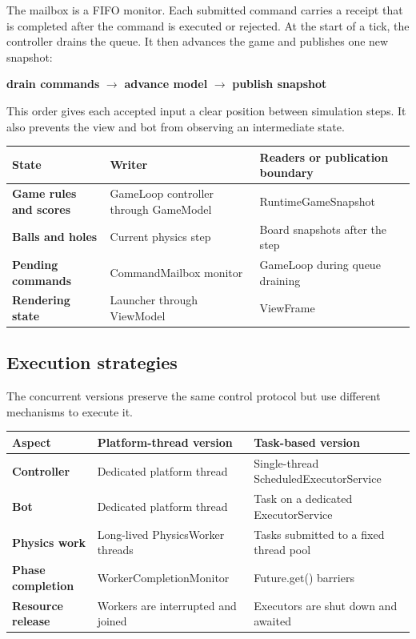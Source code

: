 The mailbox is a FIFO monitor. Each submitted command carries a receipt that
is completed after the command is executed or rejected. At the start of a
tick, the controller drains the queue. It then advances the game and publishes
one new snapshot:

\begin{center}
\textbf{drain commands} $\rightarrow$ \textbf{advance model}
$\rightarrow$ \textbf{publish snapshot}
\end{center}

This order gives each accepted input a clear position between simulation
steps. It also prevents the view and bot from observing an intermediate state.

\begin{center}
\begin{tabular}{|>{\bfseries}p{3.1cm}|p{5.2cm}|p{5.2cm}|}
    \hline
    State & Writer & Readers or publication boundary \\
    \hline
    Game rules and scores & GameLoop controller through GameModel & RuntimeGameSnapshot \\
    \hline
    Balls and holes & Current physics step & Board snapshots after the step \\
    \hline
    Pending commands & CommandMailbox monitor & GameLoop during queue draining \\
    \hline
    Rendering state & Launcher through ViewModel & ViewFrame \\
    \hline
\end{tabular}
\end{center}

\subsection{Execution strategies}

The concurrent versions preserve the same control protocol but use different
mechanisms to execute it.

\begin{center}
\begin{tabular}{|>{\bfseries}p{3.1cm}|p{5.2cm}|p{5.2cm}|}
    \hline
    Aspect & Platform-thread version & Task-based version \\
    \hline
    Controller & Dedicated platform thread & Single-thread ScheduledExecutorService \\
    \hline
    Bot & Dedicated platform thread & Task on a dedicated ExecutorService \\
    \hline
    Physics work & Long-lived PhysicsWorker threads & Tasks submitted to a fixed thread pool \\
    \hline
    Phase completion & WorkerCompletionMonitor & Future.get() barriers \\
    \hline
    Resource release & Workers are interrupted and joined & Executors are shut down and awaited \\
    \hline
\end{tabular}
\end{center}

